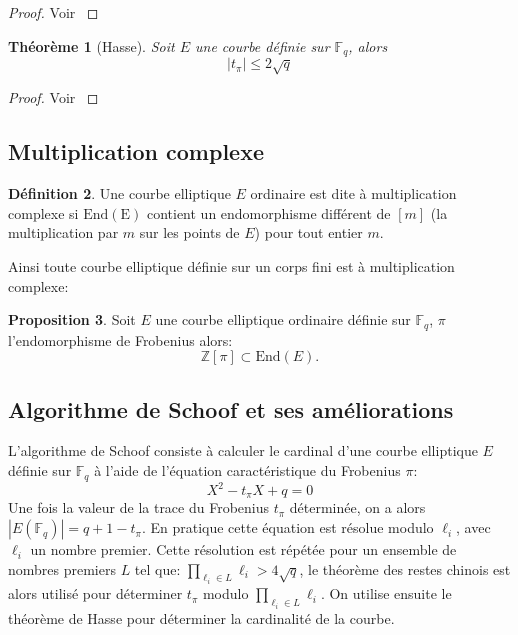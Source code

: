 \documentclass[10pt,a4paper]{book}
\theoremstyle{plain}
\newtheorem{thm}{Théorème}[chapter]
\theoremstyle{definition}
\theoremstyle{definition}
\theoremstyle{definition}
\newtheorem{prop}[thm]{Proposition}
\theoremstyle{definition}
\newtheorem{defi}[thm]{Définition}
\theoremstyle{remark}
\theoremstyle{remark}
\theoremstyle{definition}
\begin{document}
\begin{proof}
Voir \cite[Theorem V.1.1]{Silv1}
\end{proof}

\begin{thm}[Hasse]
Soit $E$ une courbe définie sur $\mathbb{F}_q$, alors 
\begin{equation}
|t_{\pi}| \leqslant 2 \sqrt{q}
\end{equation}
\end{thm}

\begin{proof}
Voir \cite[Theorem V.1.1]{Silv1}
\end{proof}





\subsection{Multiplication complexe}

\begin{defi}
Une courbe elliptique $E$ ordinaire est dite à multiplication complexe si $\mathrm{End(E)}$ contient un endomorphisme différent de $[m]$ (la multiplication par $m$ sur les points de $E$) pour tout entier $m$. 
\end{defi} 

Ainsi toute courbe elliptique définie sur un corps fini est à multiplication complexe:

\begin{prop}
Soit $E$ une courbe elliptique ordinaire définie sur $\mathbb{F}_q$, $\pi$ l'endomorphisme de Frobenius alors: 
\[
\mathbb{Z}[\pi] \subset \mathrm{End}(E).
\]
\end{prop}


\subsection{Algorithme de Schoof et ses améliorations}
\label{sub-sec:schoof}
L'algorithme de Schoof \cite{Schoof85} consiste à calculer le cardinal d'une courbe elliptique $E$ définie sur $\mathbb{F}_q$ à l'aide de l'équation caractéristique du Frobenius $\pi$:
\begin{equation*}
X^2-t_{\pi}X+q=0
\end{equation*}
Une fois la valeur de la trace du Frobenius $t_{\pi}$ déterminée, on a alors $|E(\mathbb{F}_q)|=q+1-t_{\pi}$. En pratique cette équation est résolue modulo $\ell_i$, avec $\ell_i$ un nombre premier. Cette résolution est répétée pour un ensemble de nombres premiers $L$ tel que: $\prod_{\ell_i \in L}\ell_i>4 \sqrt{q}$, le théorème des restes chinois est alors utilisé pour déterminer $t_{\pi}$ modulo $\prod_{\ell_i \in L}\ell_i$. On utilise ensuite le théorème de Hasse pour déterminer la cardinalité de la courbe.
\end{document}
